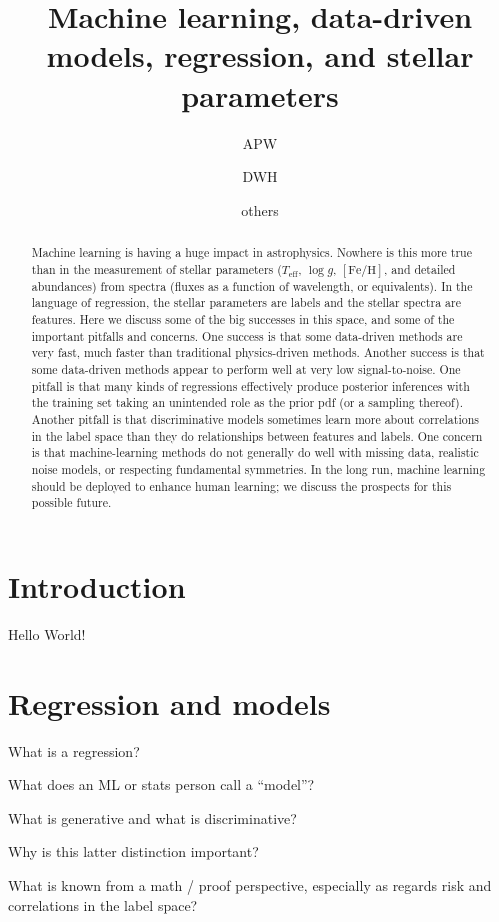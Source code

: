 \documentclass[modern]{aastex631}
\newcommand{\teff}{T_{\mathrm{eff}}}
\newcommand{\logg}{\log g}
\newcommand{\feh}{[\mathrm{Fe}/\mathrm{H}]}
\begin{document}
\title{Machine learning, data-driven models, regression, and stellar parameters}

\author{APW}
\author{DWH}
\author{others}

\begin{abstract}\noindent %
  Machine learning is having a huge impact in astrophysics.
  Nowhere is this more true than in the measurement of stellar parameters ($\teff$, $\logg$, $\feh$, and detailed abundances) from spectra (fluxes as a function of wavelength, or equivalents).
  In the language of regression, the stellar parameters are labels and the stellar spectra are features.
  Here we discuss some of the big successes in this space, and some of the important pitfalls and concerns.
  One success is that some data-driven methods are very fast, much faster than traditional physics-driven methods.
  Another success is that some data-driven methods appear to perform well at very low signal-to-noise.
  One pitfall is that many kinds of regressions effectively produce posterior inferences with the training set taking an unintended role as the prior pdf (or a sampling thereof).
  Another pitfall is that discriminative models sometimes learn more about correlations in the label space than they do relationships between features and labels.
  One concern is that machine-learning methods do not generally do well with missing data, realistic noise models, or respecting fundamental symmetries.
  In the long run, machine learning should be deployed to enhance human learning; we discuss the prospects for this possible future.
\end{abstract}

\section{Introduction} \label{sec:intro}

Hello World!

\section{Regression and models}

What is a regression?

What does an ML or stats person call a ``model''?

What is generative and what is discriminative?

Why is this latter distinction important?

What is known from a math / proof perspective, especially as regards risk and correlations in the label space?
\end{document}
